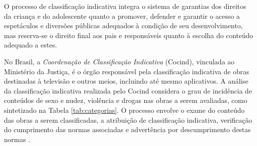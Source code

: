 
O processo de classificação indicativa integra o sistema de garantias dos direitos da criança e do adolescente quanto a promover, defender e garantir o acesso a espetáculos e diversões públicas adequados à condição de seu desenvolvimento, mas reserva-se o direito final aos pais e responsáveis quanto à escolha do conteúdo adequado a estes\cite{eca}.

No Brasil, a \emph{Coordenação de Classificação Indicativa} (Cocind), vinculada ao Ministério da Justiça, é o órgão responsável pela classificação indicativa de obras destinadas à televisão e outros meios, incluindo até mesmo aplicativos. A análise da classificação indicativa realizada pelo Cocind considera o grau de incidência de conteúdos de sexo e nudez, violência e drogas nas obras a serem avaliadas, como sintetizado na Tabela \ref{tab:categorias}. O processo envolve o exame do conteúdo das obras a serem classificadas, a atribuição de classificação indicativa, verificação do cumprimento das normas associadas e advertência por descumprimento destas normas \cite{portaria:ci}.




